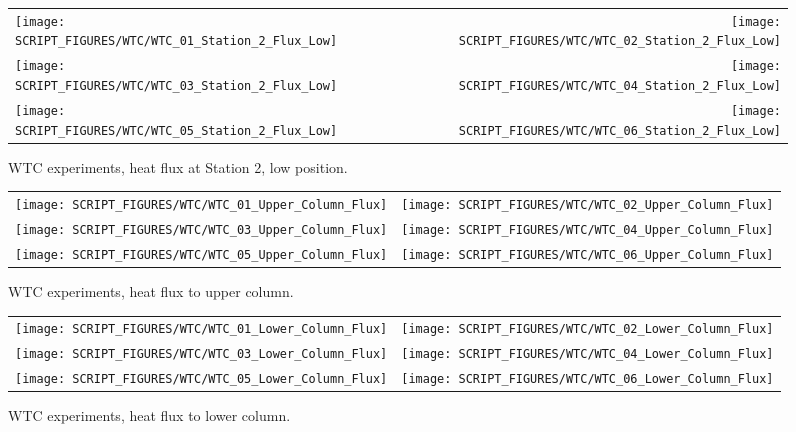 \newpage

\begin{figure}[p]
\begin{tabular*}{\textwidth}{l@{\extracolsep{\fill}}r}
\texttt{[image: SCRIPT\_FIGURES/WTC/WTC\_01\_Station\_2\_Flux\_Low]} &
\texttt{[image: SCRIPT\_FIGURES/WTC/WTC\_02\_Station\_2\_Flux\_Low]} \\
\texttt{[image: SCRIPT\_FIGURES/WTC/WTC\_03\_Station\_2\_Flux\_Low]} &
\texttt{[image: SCRIPT\_FIGURES/WTC/WTC\_04\_Station\_2\_Flux\_Low]} \\
\texttt{[image: SCRIPT\_FIGURES/WTC/WTC\_05\_Station\_2\_Flux\_Low]} &
\texttt{[image: SCRIPT\_FIGURES/WTC/WTC\_06\_Station\_2\_Flux\_Low]}
\end{tabular*}
\caption[WTC experiments, heat flux at Station 2, low position]
{WTC experiments, heat flux at Station 2, low position.}
\label{NIST_WTC_Station_2_Flux_Low}
\end{figure}

\begin{figure}[p]
\begin{tabular*}{\textwidth}{l@{\extracolsep{\fill}}r}
\texttt{[image: SCRIPT\_FIGURES/WTC/WTC\_01\_Upper\_Column\_Flux]} &
\texttt{[image: SCRIPT\_FIGURES/WTC/WTC\_02\_Upper\_Column\_Flux]} \\
\texttt{[image: SCRIPT\_FIGURES/WTC/WTC\_03\_Upper\_Column\_Flux]} &
\texttt{[image: SCRIPT\_FIGURES/WTC/WTC\_04\_Upper\_Column\_Flux]} \\
\texttt{[image: SCRIPT\_FIGURES/WTC/WTC\_05\_Upper\_Column\_Flux]} &
\texttt{[image: SCRIPT\_FIGURES/WTC/WTC\_06\_Upper\_Column\_Flux]}
\end{tabular*}
\caption[WTC experiments, heat flux to upper column]
{WTC experiments, heat flux to upper column.}
\label{NIST_WTC_Upper_Column_Flux}
\end{figure}

\begin{figure}[p]
\begin{tabular*}{\textwidth}{l@{\extracolsep{\fill}}r}
\texttt{[image: SCRIPT\_FIGURES/WTC/WTC\_01\_Lower\_Column\_Flux]} &
\texttt{[image: SCRIPT\_FIGURES/WTC/WTC\_02\_Lower\_Column\_Flux]} \\
\texttt{[image: SCRIPT\_FIGURES/WTC/WTC\_03\_Lower\_Column\_Flux]} &
\texttt{[image: SCRIPT\_FIGURES/WTC/WTC\_04\_Lower\_Column\_Flux]} \\
\texttt{[image: SCRIPT\_FIGURES/WTC/WTC\_05\_Lower\_Column\_Flux]} &
\texttt{[image: SCRIPT\_FIGURES/WTC/WTC\_06\_Lower\_Column\_Flux]}
\end{tabular*}
\caption[WTC experiments, heat flux to lower column]
{WTC experiments, heat flux to lower column.}
\label{NIST_WTC_Lower_Column_Flux}
\end{figure}

